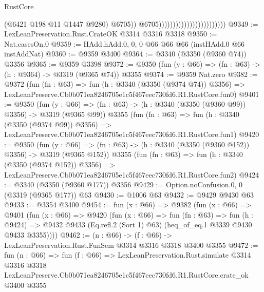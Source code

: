 \begin{lexlean}{RustCore}
\begin{coremodule}
                                                        (@6421 @198 @11 @1447 @9280)
                                                        @6705))
                                                    @6705))))))))))))))))))))))))
@9349 := LexLeanPreservation.Rust.CrateOK @3314 @3316 @3318
@9350 := Nat.casesOn.{0}
@9359 := HAdd.hAdd.{0, 0, 0} @66 @66 @66 (instHAdd.{0} @66 instAddNat)
@9360 := @9359 @3400
@9364 := @3340 (@3350 (@9360 @74)) @3356
@9365 := @9359 @3398
@9372 := @9350 (fun (y : @66) => (fn : @63) -> (h : @9364) -> @3319 (@9365 @74)) @3355
@9374 := @9359 Nat.zero
@9382 := @9372
    (fun (fn : @63) =>
    fun (h : @3340 (@3350 (@9374 @74)) @3356) =>
    LexLeanPreserve.Cb0b071ea8246705e1c5f467eec730fd6.R1.RustCore.fun0)
@9401 := @9350
    (fun (y : @66) => (fn : @63) -> (h : @3340 (@3350 (@9360 @99)) @3356) -> @3319 (@9365 @99))
    @3355
    (fun (fn : @63) =>
    fun (h : @3340 (@3350 (@9374 @99)) @3356) =>
    LexLeanPreserve.Cb0b071ea8246705e1c5f467eec730fd6.R1.RustCore.fun1)
@9420 := @9350
    (fun (y : @66) => (fn : @63) -> (h : @3340 (@3350 (@9360 @152)) @3356) -> @3319 (@9365 @152))
    @3355
    (fun (fn : @63) =>
    fun (h : @3340 (@3350 (@9374 @152)) @3356) =>
    LexLeanPreserve.Cb0b071ea8246705e1c5f467eec730fd6.R1.RustCore.fun2)
@9424 := @3340 (@3350 (@9360 @177)) @3356
@9429 := Option.noConfusion.{0, 0} (@3319 (@9365 @177)) @63
@9430 := @1006 @63
@9432 := @9429 @9430 @63
@9433 := @3354 @3400
@9454 := fun (x : @66) =>
  @9382
    (fun (x : @66) =>
    @9401
      (fun (x : @66) =>
      @9420
        (fun (x : @66) =>
        fun (fn : @63) =>
        fun (h : @9424) =>
        @9432 @9433 (Eq.refl.{2} (Sort 1) @63) (heq_of_eq.{1} @3339 @9430 @9433 @3355))))
@9462 := (n : @66) -> (f : @66) -> LexLeanPreservation.Rust.FunSem @3314 @3316 @3318 @3400 @3355
@9472 := fun (n : @66) =>
  fun (f : @66) =>
  LexLeanPreservation.Rust.simulate
    @3314
    @3316
    @3318
    LexLeanPreserve.Cb0b071ea8246705e1c5f467eec730fd6.R1.RustCore.crate_ok
    @3400
    @3355
\end{coremodule}
\end{lexlean}
